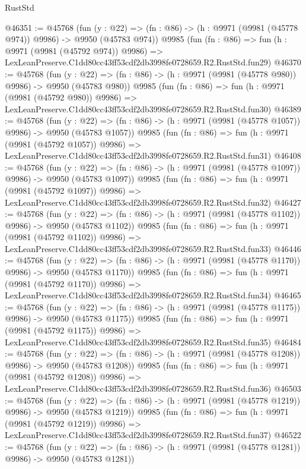 \begin{lexlean}{RustStd}
\begin{coremodule}
@46351 := @45768
    (fun (y : @22) => (fn : @86) -> (h : @9971 (@9981 (@45778 @974)) @9986) -> @9950 (@45783 @974))
    @9985
    (fun (fn : @86) =>
    fun (h : @9971 (@9981 (@45792 @974)) @9986) =>
    LexLeanPreserve.C1dd80cc43ff53cdf2db3998fe0728659.R2.RustStd.fun29)
@46370 := @45768
    (fun (y : @22) => (fn : @86) -> (h : @9971 (@9981 (@45778 @980)) @9986) -> @9950 (@45783 @980))
    @9985
    (fun (fn : @86) =>
    fun (h : @9971 (@9981 (@45792 @980)) @9986) =>
    LexLeanPreserve.C1dd80cc43ff53cdf2db3998fe0728659.R2.RustStd.fun30)
@46389 := @45768
    (fun (y : @22) =>
    (fn : @86) -> (h : @9971 (@9981 (@45778 @1057)) @9986) -> @9950 (@45783 @1057))
    @9985
    (fun (fn : @86) =>
    fun (h : @9971 (@9981 (@45792 @1057)) @9986) =>
    LexLeanPreserve.C1dd80cc43ff53cdf2db3998fe0728659.R2.RustStd.fun31)
@46408 := @45768
    (fun (y : @22) =>
    (fn : @86) -> (h : @9971 (@9981 (@45778 @1097)) @9986) -> @9950 (@45783 @1097))
    @9985
    (fun (fn : @86) =>
    fun (h : @9971 (@9981 (@45792 @1097)) @9986) =>
    LexLeanPreserve.C1dd80cc43ff53cdf2db3998fe0728659.R2.RustStd.fun32)
@46427 := @45768
    (fun (y : @22) =>
    (fn : @86) -> (h : @9971 (@9981 (@45778 @1102)) @9986) -> @9950 (@45783 @1102))
    @9985
    (fun (fn : @86) =>
    fun (h : @9971 (@9981 (@45792 @1102)) @9986) =>
    LexLeanPreserve.C1dd80cc43ff53cdf2db3998fe0728659.R2.RustStd.fun33)
@46446 := @45768
    (fun (y : @22) =>
    (fn : @86) -> (h : @9971 (@9981 (@45778 @1170)) @9986) -> @9950 (@45783 @1170))
    @9985
    (fun (fn : @86) =>
    fun (h : @9971 (@9981 (@45792 @1170)) @9986) =>
    LexLeanPreserve.C1dd80cc43ff53cdf2db3998fe0728659.R2.RustStd.fun34)
@46465 := @45768
    (fun (y : @22) =>
    (fn : @86) -> (h : @9971 (@9981 (@45778 @1175)) @9986) -> @9950 (@45783 @1175))
    @9985
    (fun (fn : @86) =>
    fun (h : @9971 (@9981 (@45792 @1175)) @9986) =>
    LexLeanPreserve.C1dd80cc43ff53cdf2db3998fe0728659.R2.RustStd.fun35)
@46484 := @45768
    (fun (y : @22) =>
    (fn : @86) -> (h : @9971 (@9981 (@45778 @1208)) @9986) -> @9950 (@45783 @1208))
    @9985
    (fun (fn : @86) =>
    fun (h : @9971 (@9981 (@45792 @1208)) @9986) =>
    LexLeanPreserve.C1dd80cc43ff53cdf2db3998fe0728659.R2.RustStd.fun36)
@46503 := @45768
    (fun (y : @22) =>
    (fn : @86) -> (h : @9971 (@9981 (@45778 @1219)) @9986) -> @9950 (@45783 @1219))
    @9985
    (fun (fn : @86) =>
    fun (h : @9971 (@9981 (@45792 @1219)) @9986) =>
    LexLeanPreserve.C1dd80cc43ff53cdf2db3998fe0728659.R2.RustStd.fun37)
@46522 := @45768
    (fun (y : @22) =>
    (fn : @86) -> (h : @9971 (@9981 (@45778 @1281)) @9986) -> @9950 (@45783 @1281))

\end{coremodule}
\end{lexlean}
